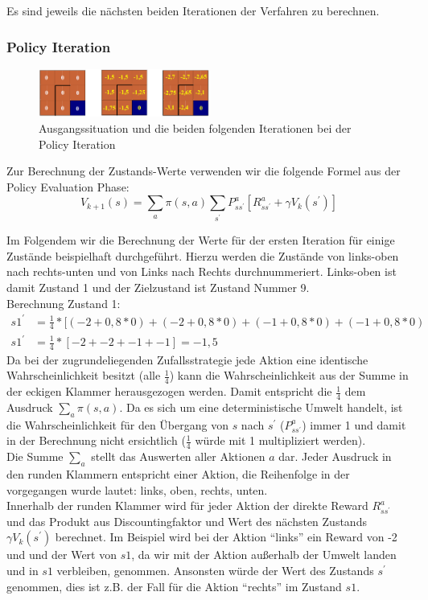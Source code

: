 \documentclass[10pt]{scrartcl}
\begin{document}
Es sind jeweils die nächsten beiden Iterationen der Verfahren zu berechnen.

\subsubsection{Policy Iteration}
\label{sec:anwendung_policy_iteration}

\begin{figure}[htbp]
	\centering	\includegraphics[width=0.5\textwidth]{Bilder/PolicyIterationAufgabe}
	\caption{Ausgangssituation und die beiden folgenden Iterationen bei der Policy Iteration}
	\label{fig:policy_aufgabe}
\end{figure}

Zur Berechnung der Zustands-Werte verwenden wir die folgende Formel aus der Policy Evaluation Phase:
\begin{equation}
V_{k+1}(s) = \sum_{a} \pi(s,a) \sum_{s^{'}} P^a_{ss^{'}} [R^a_{ss^{'}} + \gamma V_{k} (s^{'})]
\end{equation}

Im Folgendem wir die Berechnung der Werte für der ersten Iteration für einige Zustände beispielhaft durchgeführt.
Hierzu werden die Zustände von links-oben nach rechts-unten und von Links nach Rechts durchnummeriert.
Links-oben ist damit Zustand 1 und der Zielzustand ist Zustand Nummer 9.\\

Berechnung Zustand 1:
\begin{align}
	s1^{'} &= \frac{1}{4} * [(-2 + 0,8 * 0) + (-2 + 0,8 * 0) + (-1 + 0,8 * 0) + (-1 + 0,8 * 0)\\
	s1^{'} &= \frac{1}{4} * [ -2 + -2 + -1 + -1 ] = -1,5
\end{align}
Da bei der zugrundeliegenden Zufallsstrategie jede Aktion eine identische Wahrscheinlichkeit besitzt (alle $\frac{1}{4}$) kann die Wahrscheinlichkeit aus der Summe in der eckigen Klammer herausgezogen werden.
Damit entspricht die $\frac{1}{4}$ dem Ausdruck $\sum_{a} \pi(s,a)$. 
Da es sich um eine deterministische Umwelt handelt, ist die Wahrscheinlichkeit für den Übergang von $s$ nach $s^{'}$ ($P^a_{ss^{'}}$) immer 1 und damit in der Berechnung nicht ersichtlich ($\frac{1}{4}$ würde mit 1 multipliziert werden).\\
Die Summe $\sum_{a}$ stellt das Auswerten aller Aktionen $a$ dar.
Jeder Ausdruck in den runden Klammern entspricht einer Aktion, die Reihenfolge in der vorgegangen wurde lautet: links, oben, rechts, unten.\\
Innerhalb der runden Klammer wird für jeder Aktion der direkte Reward $R^a_{ss^{'}}$ und das Produkt aus Discountingfaktor und Wert des nächsten Zustands $\gamma V_{k} (s^{'})$ berechnet.
Im Beispiel wird bei der Aktion "`links"' ein Reward von -2 und und der Wert von $s1$, da wir mit der Aktion außerhalb der Umwelt landen und in $s1$ verbleiben, genommen.
Ansonsten würde der Wert des Zustands $s^{'}$ genommen, dies ist z.B. der Fall für die Aktion "`rechts"' im Zustand $s1$.\\
\end{document}
